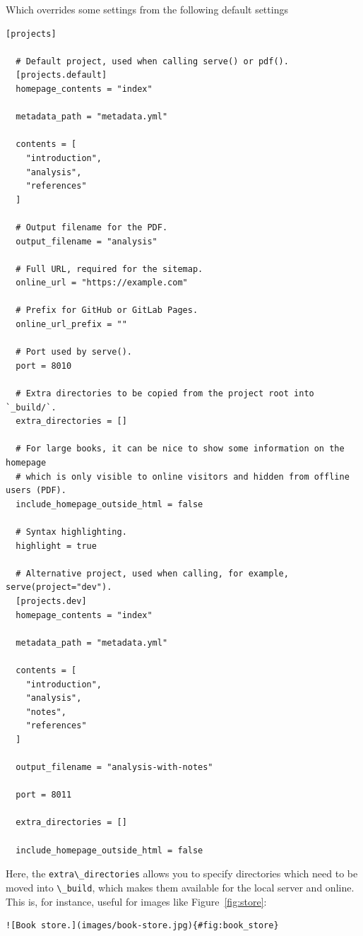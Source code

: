 \documentclass[
  notoc %
]{tufte-book}
\newcommand{\passthrough}[1]{#1}
\begin{document}
Which overrides some settings from the following default settings

\begin{lstlisting}[language=Output]
[projects]

  # Default project, used when calling serve() or pdf().
  [projects.default]
  homepage_contents = "index"

  metadata_path = "metadata.yml"

  contents = [
    "introduction",
    "analysis",
    "references"
  ]

  # Output filename for the PDF.
  output_filename = "analysis"

  # Full URL, required for the sitemap.
  online_url = "https://example.com"

  # Prefix for GitHub or GitLab Pages.
  online_url_prefix = ""

  # Port used by serve().
  port = 8010

  # Extra directories to be copied from the project root into `_build/`.
  extra_directories = []

  # For large books, it can be nice to show some information on the homepage
  # which is only visible to online visitors and hidden from offline users (PDF).
  include_homepage_outside_html = false

  # Syntax highlighting.
  highlight = true

  # Alternative project, used when calling, for example, serve(project="dev").
  [projects.dev]
  homepage_contents = "index"

  metadata_path = "metadata.yml"

  contents = [
    "introduction",
    "analysis",
    "notes",
    "references"
  ]

  output_filename = "analysis-with-notes"

  port = 8011

  extra_directories = []

  include_homepage_outside_html = false

\end{lstlisting}

Here, the \passthrough{\lstinline!extra\_directories!} allows you to
specify directories which need to be moved into
\passthrough{\lstinline!\_build!}, which makes them available for the
local server and online. This is, for instance, useful for images like
Figure~\ref{fig:store}:

\begin{lstlisting}
![Book store.](images/book-store.jpg){#fig:book_store}
\end{lstlisting}
\end{document}

